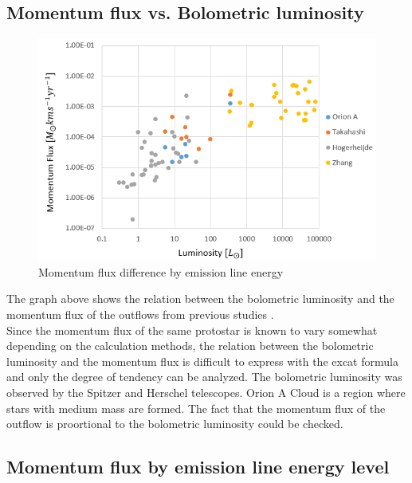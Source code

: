 \documentclass[twoside,11pt]{gshs_thesis}
\begin{document}
\clearpage
\newpage
\subsection{Momentum flux vs. Bolometric luminosity}


\begin{figure}[h!]
	\centering
	\includegraphics[width=\textwidth]{Luminosity.PNG}
	\caption{Momentum flux difference by emission line energy}
\end{figure}


The graph above shows the relation between the bolometric luminosity and the momentum flux of the outflows from previous studies \cite{Takahashi, Marel, Hogerheijde, Nakamura, Aso, Zhang}. \\ Since the momentum flux of the same protostar is known to vary somewhat depending on the calculation methods\cite{Marel}, the relation between the bolometric luminosity and the momentum flux is difficult to express with the excat formula and only the degree of tendency can be analyzed.
The bolometric luminosity was observed by the Spitzer and Herschel telescopes. Orion A Cloud is a region where stars with medium mass are formed. The fact that the momentum flux of the outflow is proortional to the bolometric luminosity could be checked.

\newpage

\subsection{Momentum flux by emission line energy level}
\end{document}
